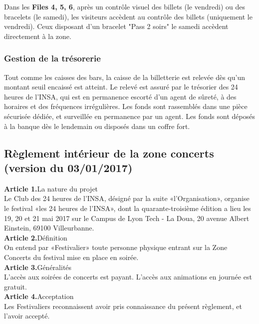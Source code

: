 \documentclass[hidelinks, paper=a4, fontsize=13pt]{report}
\begin{document}
Dans les \textbf{Files 4, 5, 6}, après un contrôle visuel des billets (le vendredi) ou des bracelets (le samedi), les visiteurs accèdent au contrôle des billets (uniquement le vendredi). Ceux disposant d'un bracelet "Pass 2 soirs" le samedi accèdent directement à la zone.


\subsubsection{Gestion de la trésorerie}
Tout comme les caisses des bars, la caisse de la billetterie est relevée dès qu’un montant seuil encaissé est atteint. Le relevé est assuré par le trésorier des 24 heures de l'INSA, qui est en permanence escorté d’un agent de sûreté, à des horaires et des fréquences irrégulières. Les fonds sont rassemblés dans une pièce sécurisée dédiée, et surveillée en permanence par un agent. Les fonds sont déposés à la banque dès le lendemain ou disposés dans un coffre fort. 

\newpage 

\subsection{Règlement intérieur de la zone concerts (version du 03/01/2017)}


\textbf{Article 1.}\hspace{3mm}La nature du projet\\
Le Club des 24 heures  de l’INSA, désigné par la suite «l’Organisation», organise le festival «les 24 heures de l’INSA», dont la quarante-troisième édition a lieu les 19, 20 et 21 mai 2017 sur le Campus de Lyon Tech - La Doua, 20 avenue Albert Einstein, 69100 Villeurbanne.\\


\textbf{Article 2.}\hspace{3mm}Définition\\
On entend par «Festivalier» toute personne physique entrant sur la Zone Concerts du festival mise en place en soirée.\\


\textbf{Article 3.}\hspace{3mm}Généralités\\
L’accès aux soirées de concerts est payant. L’accès aux animations en journée est gratuit.\\


\textbf{Article 4.}\hspace{3mm}Acceptation\\
Les Festivaliers reconnaissent avoir pris connaissance du présent règlement, et l'avoir accepté.\\
\end{document}
